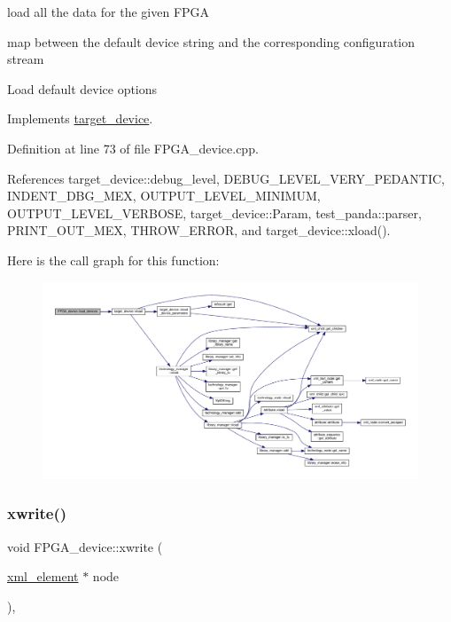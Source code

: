 load all the data for the given F\+P\+GA 

map between the default device string and the corresponding configuration stream

Load default device options 

Implements \hyperlink{classtarget__device_a1823ff5860c8045600b512588415ac6e}{target\+\_\+device}.



Definition at line 73 of file F\+P\+G\+A\+\_\+device.\+cpp.



References target\+\_\+device\+::debug\+\_\+level, D\+E\+B\+U\+G\+\_\+\+L\+E\+V\+E\+L\+\_\+\+V\+E\+R\+Y\+\_\+\+P\+E\+D\+A\+N\+T\+IC, I\+N\+D\+E\+N\+T\+\_\+\+D\+B\+G\+\_\+\+M\+EX, O\+U\+T\+P\+U\+T\+\_\+\+L\+E\+V\+E\+L\+\_\+\+M\+I\+N\+I\+M\+UM, O\+U\+T\+P\+U\+T\+\_\+\+L\+E\+V\+E\+L\+\_\+\+V\+E\+R\+B\+O\+SE, target\+\_\+device\+::\+Param, test\+\_\+panda\+::parser, P\+R\+I\+N\+T\+\_\+\+O\+U\+T\+\_\+\+M\+EX, T\+H\+R\+O\+W\+\_\+\+E\+R\+R\+OR, and target\+\_\+device\+::xload().

Here is the call graph for this function\+:
\nopagebreak
\begin{figure}[H]
\begin{center}
\leavevmode
\includegraphics[width=350pt]{db/dd5/classFPGA__device_aabe12325194fdd8b0f03ed674f64419b_cgraph}
\end{center}
\end{figure}
\mbox{\label{classFPGA__device_afc6da3ca7ff26af47400272956f6c397}} 
\subsubsection{\texorpdfstring{xwrite()}{xwrite()}}
{\footnotesize\ttfamily void F\+P\+G\+A\+\_\+device\+::xwrite (\begin{DoxyParamCaption}\item[{\hyperlink{classxml__element}{xml\+\_\+element} $\ast$}]{node }\end{DoxyParamCaption})\hspace{0.3cm}{\ttfamily [override]}, {\ttfamily [virtual]}}



